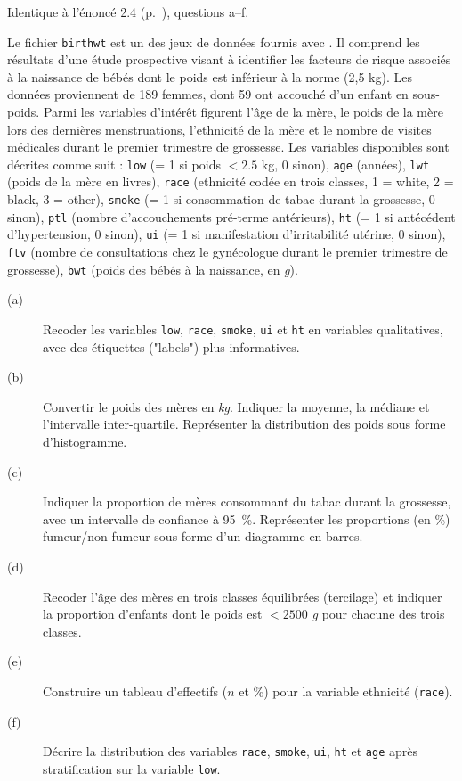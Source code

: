 \begin{exo}\label{exo:8.6}
{\footnotesize Identique à l'énoncé 2.4 (p.~\pageref{exo:2.4}), questions
  a–f.} 

Le fichier \texttt{birthwt} est un des jeux de données fournis avec \R. Il
comprend les résultats d'une étude prospective visant à identifier les
facteurs de risque associés à la naissance de bébés dont le poids est
inférieur à la norme (2,5 kg). Les données proviennent de 189 femmes, dont
59 ont accouché d'un enfant en sous-poids. Parmi les variables d'intérêt
figurent l'âge de la mère, le poids de la mère lors des dernières
menstruations, l'ethnicité de la mère et le nombre de visites médicales
durant le premier trimestre de grossesse.\autocite{hosmer89}
Les variables disponibles sont décrites comme suit : \texttt{low} (= 1 si
poids $<2.5$ kg, 0 sinon), \texttt{age} (années), \texttt{lwt} (poids de la
mère en livres), \texttt{race} (ethnicité codée en trois classes, 1 = white,
2 = black, 3 = other), \texttt{smoke} (= 1 si consommation de tabac durant
la grossesse, 0 sinon), \texttt{ptl} (nombre d'accouchements pré-terme
antérieurs), \texttt{ht} (= 1 si antécédent d'hypertension, 0 sinon),
\texttt{ui} (= 1 si manifestation d'irritabilité utérine, 0 sinon),
\texttt{ftv} (nombre de consultations chez le gynécologue durant le premier
trimestre de grossesse), \texttt{bwt} (poids des bébés à la naissance, en
\emph{g}).
\begin{description}
\item[(a)] Recoder les variables \texttt{low}, \texttt{race},
  \texttt{smoke}, \texttt{ui} et \texttt{ht} en variables
  qualitatives, avec des étiquettes ("labels") plus informatives.
\item[(b)] Convertir le poids des mères en \emph{kg}. Indiquer la moyenne, la
  médiane et l'intervalle inter-quartile. Représenter la distribution des
  poids sous forme d'histogramme.
\item[(c)] Indiquer la proportion de mères consommant du tabac durant la
  grossesse, avec un intervalle de confiance à 95~\%. Représenter les
  proportions (en \%) fumeur/non-fumeur sous forme d'un diagramme en
  barres.
\item[(d)] Recoder l'âge des mères en trois classes équilibrées (tercilage)
  et indiquer la proportion d'enfants dont le poids est $<2500$ \emph{g}
  pour chacune des trois classes.
\item[(e)] Construire un tableau d'effectifs ($n$ et \%) pour la variable
  ethnicité (\texttt{race}).  
\item[(f)] Décrire la distribution des variables \texttt{race},
  \texttt{smoke}, \texttt{ui}, \texttt{ht} et \texttt{age} après
  stratification sur la variable \texttt{low}.  
\end{description}
\end{exo}

